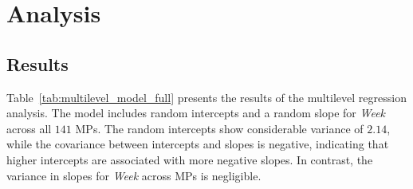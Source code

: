 \documentclass{article}
\begin{document}
\section{Analysis}

\subsection{Results}
Table~\ref{tab:multilevel_model_full} presents the results of the multilevel regression analysis. The model includes random intercepts and a random slope for \textit{Week} across all $141$ MPs. The random intercepts show considerable variance of $2.14$, while the covariance between intercepts and slopes is negative, indicating that higher intercepts are associated with more negative slopes. In contrast, the variance in slopes for \textit{Week} across MPs is negligible.

\begin{table}[H]
    \centering
    
    \vspace{1em} %
    
    \caption{Multilevel Regression Model Summary}
    \label{tab:multilevel_model_full}
\end{table}
\end{document}
